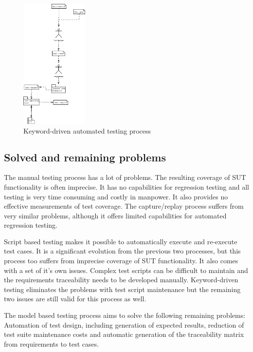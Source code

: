 \begin{figure}[ht]
	\begin{center}
		\includegraphics*[width=0.3\textwidth]{kuvat/KW_process}
	\end{center}
	\caption{Keyword-driven automated testing process}
	\label{fig:kwprocess}
\end{figure}

\subsection{Solved and remaining problems}
The manual testing process has a lot of problems. The resulting coverage of SUT functionality is often imprecise. It has no capabilities for regression testing and all testing is very time consuming and costly in manpower. It also provides no effective measurements of test coverage. The capture/replay process suffers from very similar problems, although it offers limited capabilities for automated regression testing.

Script based testing makes it possible to automatically execute and re-execute test cases. It is a significant evolution from the previous two processes, but this process too suffers from imprecise coverage of SUT functionality. It also comes with a set of it's own issues. Complex test scripts can be difficult to maintain and the requirements traceability needs to be developed manually. Keyword-driven testing eliminates the problems with test script maintenance but the remaining two issues are still valid for this process as well.

The model based testing process aims to solve the following remaining problems: Automation of test design, including generation of expected results, reduction of test suite maintenance costs and automatic generation of the traceability matrix from requirements to test cases.

